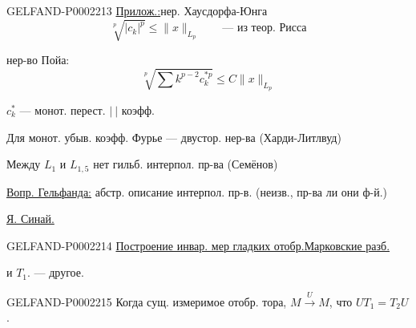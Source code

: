 \begin{GelfandAdjacentEvidence}{GELFAND-P000221}{3}
\underline{Прилож.:}\quad нер. Хаусдорфа-Юнга
\begin{equation*}
 \sqrt[p]{|c_k|^p}\leq\|x\|_{L_p}\qquad\text{— из теор. Рисса}
\end{equation*}
\end{GelfandAdjacentEvidence}

нер-во Пойа:
\begin{equation*}
 \sqrt[p]{\sum k^{p-2}c_k^{*p}}\leq C\|x\|_{L_p}
\end{equation*}



$c_k^*$ — монот. перест. $|\ |$ коэфф.



Для монот. убыв. коэфф. Фурье — двустор. нер-ва (Харди-Литлвуд)



Между $L_1$ и $L_{1,5}$ нет гильб. интерпол. пр-ва (Семёнов)



\underline{Вопр. Гельфанда:} абстр. описание интерпол. пр-в.
(неизв., пр-ва ли они ф-й.)



\underline{Я. Синай.}

\begin{GelfandAdjacentEvidence}{GELFAND-P000221}{4}
\underline{Построение инвар. мер гладких отобр.}\quad\underline{Марковские разб.}





\end{GelfandAdjacentEvidence}

и $T_1$. — другое.

\begin{GelfandAdjacentEvidence}{GELFAND-P000221}{5}
Когда сущ. измеримое отобр. тора, $M\overset{U}{\longrightarrow}M$,
что $UT_1=T_2U$.
\end{GelfandAdjacentEvidence}

